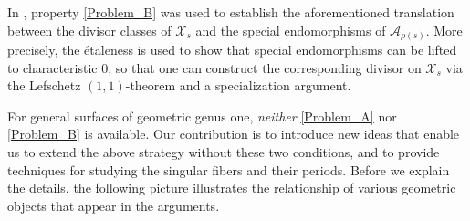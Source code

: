 \documentclass[11pt, letterpaper]{amsart}
\theoremstyle{plain}
\theoremstyle{definition}
\newcommand{\<}{\langle}
\renewcommand{\>}{\rangle}
\newcommand{\sA}{\mathcal{A}}
\newcommand{\sX}{\mathcal{X}}
\begin{document}
In \cite{MPTate}, property \ref{Problem_B} was used to establish the aforementioned translation between the divisor classes of $\sX_s$ and the special endomorphisms of $\sA_{\rho(s)}$. 
More precisely, the \'etaleness is used to show that special endomorphisms can be lifted to characteristic $0$, so that one can construct the corresponding divisor on $\sX_s$ via the Lefschetz $(1, 1)$-theorem and a specialization argument.

For general surfaces of geometric genus one, \textit{neither} \ref{Problem_A} nor \ref{Problem_B} is available.
Our contribution is to introduce new ideas that enable us to extend the above strategy without these two conditions, and to provide techniques for studying the singular fibers and their periods.
Before we explain the details, the following picture illustrates the relationship of various geometric objects that appear in the arguments. 




\end{document}
